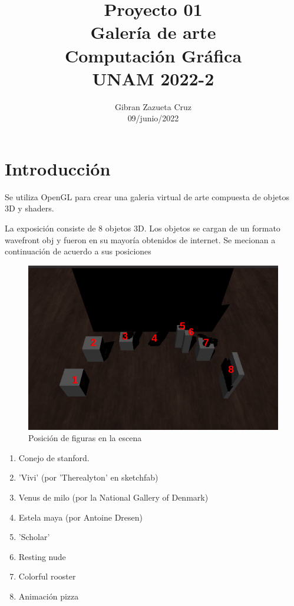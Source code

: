 \documentclass[12pt]{article}
\title{%
  Proyecto 01\\
  \large Galería de arte \\
    \Large Computación Gráfica\\
     \large UNAM 2022-2}
\author{Gibran Zazueta Cruz \\
\small 09/junio/2022}
\date{}
\begin{document}
\maketitle

\section{Introducción}

Se utiliza OpenGL para crear una galeria virtual de arte compuesta de objetos 3D y shaders.

La exposición consiste de 8 objetos 3D. Los objetos se cargan de un formato wavefront obj y fueron en su mayoría obtenidos de internet. Se mecionan a continuación de acuerdo a sus posiciones

\begin{figure}[H]
\centering
\includegraphics[scale=0.5]{images/posicion.png}
\caption{Posición de figuras en la escena}
\end{figure}

\begin{enumerate}

\item Conejo de stanford.
\item 'Vivi' (por 'Therealyton' en sketchfab)
\item Venus de milo (por la National Gallery of Denmark)
\item Estela maya (por Antoine Dresen)
\item 'Scholar'
\item Resting nude
\item Colorful rooster
\item Animación pizza
\end{enumerate}
\end{document}
